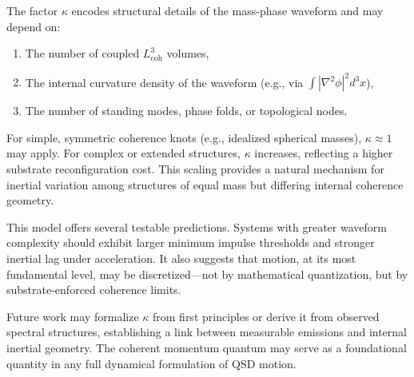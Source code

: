 \documentclass[entropy,article,submit,pdftex,oneauthor]{Definitions/mdpi}
\begin{document}
The factor \( \kappa \) encodes structural details of the mass-phase waveform and may depend on:
\begin{enumerate}
    \item The number of coupled \texorpdfstring{\( L_{\text{coh}}^3 \)}{Lcoh\^{}3} volumes,
    \item The internal curvature density of the waveform (e.g., via \texorpdfstring{\( \int |\nabla^2 \phi|^2 d^3x \)}{∫|∇²ϕ|²}),
    \item The number of standing modes, phase folds, or topological nodes.
\end{enumerate}

For simple, symmetric coherence knots (e.g., idealized spherical masses), \( \kappa \approx 1 \) may apply. For complex or extended structures, \( \kappa \) increases, reflecting a higher substrate reconfiguration cost. This scaling provides a natural mechanism for inertial variation among structures of equal mass but differing internal coherence geometry.

This model offers several testable predictions. Systems with greater waveform complexity should exhibit larger minimum impulse thresholds and stronger inertial lag under acceleration. It also suggests that motion, at its most fundamental level, may be discretized—not by mathematical quantization, but by substrate-enforced coherence limits.

Future work may formalize \( \kappa \) from first principles or derive it from observed spectral structures, establishing a link between measurable emissions and internal inertial geometry. The coherent momentum quantum may serve as a foundational quantity in any full dynamical formulation of QSD motion.
\end{document}
